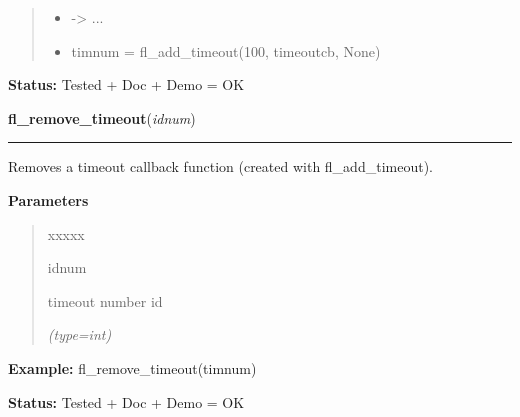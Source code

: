 \begin{boxedminipage}{\funcwidth}
\begin{quote}
\begin{itemize}
  \item {\textbar}-{\textgreater}{\textbar} ...



  \item timnum = fl\_add\_timeout(100, timeoutcb, None)



\end{itemize}

\end{quote}

\textbf{Status:} Tested + Doc + Demo = OK



    \end{boxedminipage}

    \label{xformslib:flbasic:fl_remove_timeout}

    \vspace{0.5ex}

\hspace{.8\funcindent}\begin{boxedminipage}{\funcwidth}

    \raggedright \textbf{fl\_remove\_timeout}(\textit{idnum})

    \vspace{-1.5ex}

    \rule{\textwidth}{0.5\fboxrule}
\setlength{\parskip}{2ex}
    Removes a timeout callback function (created with fl\_add\_timeout).

\setlength{\parskip}{1ex}
      \textbf{Parameters}
      \vspace{-1ex}

      \begin{quote}
        \begin{Ventry}{xxxxx}

          \item[idnum]

          timeout number id

            {\it (type=int)}

        \end{Ventry}

      \end{quote}

\textbf{Example:} fl\_remove\_timeout(timnum)



\textbf{Status:} Tested + Doc + Demo = OK



    \end{boxedminipage}

